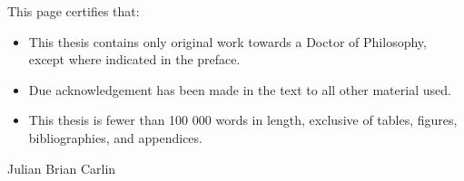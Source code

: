 This page certifies that:
\begin{itemize}
\item This thesis contains only original work towards a Doctor of Philosophy, except where indicated in the preface.
\item Due acknowledgement has been made in the text to all other material used.
\item This thesis is fewer than 100 000 words in length, exclusive of tables, figures, bibliographies, and appendices.
\end{itemize}

\vspace{3cm}

\begin{flushright}
Julian Brian Carlin
\end{flushright}
